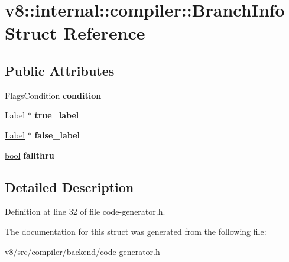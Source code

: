 \hypertarget{structv8_1_1internal_1_1compiler_1_1BranchInfo}{}\section{v8\+:\+:internal\+:\+:compiler\+:\+:Branch\+Info Struct Reference}
\label{structv8_1_1internal_1_1compiler_1_1BranchInfo}
\subsection*{Public Attributes}
\begin{DoxyCompactItemize}
\item 
\mbox{\label{structv8_1_1internal_1_1compiler_1_1BranchInfo_a9861cd47da8b1fa2e4ec197e2df02edd}} 
Flags\+Condition {\bfseries condition}
\item 
\mbox{\label{structv8_1_1internal_1_1compiler_1_1BranchInfo_a8e027905e3c008f6e4eb8a6a84e0038a}} 
\mbox{\hyperlink{classv8_1_1internal_1_1Label}{Label}} $\ast$ {\bfseries true\+\_\+label}
\item 
\mbox{\label{structv8_1_1internal_1_1compiler_1_1BranchInfo_a4c3da6b60046d8d265e5277abdf07c46}} 
\mbox{\hyperlink{classv8_1_1internal_1_1Label}{Label}} $\ast$ {\bfseries false\+\_\+label}
\item 
\mbox{\label{structv8_1_1internal_1_1compiler_1_1BranchInfo_a516a7f72d06a0b7cf755a0b8bc81d627}} 
\mbox{\hyperlink{classbool}{bool}} {\bfseries fallthru}
\end{DoxyCompactItemize}


\subsection{Detailed Description}


Definition at line 32 of file code-\/generator.\+h.



The documentation for this struct was generated from the following file\+:\begin{DoxyCompactItemize}
\item 
v8/src/compiler/backend/code-\/generator.\+h\end{DoxyCompactItemize}
